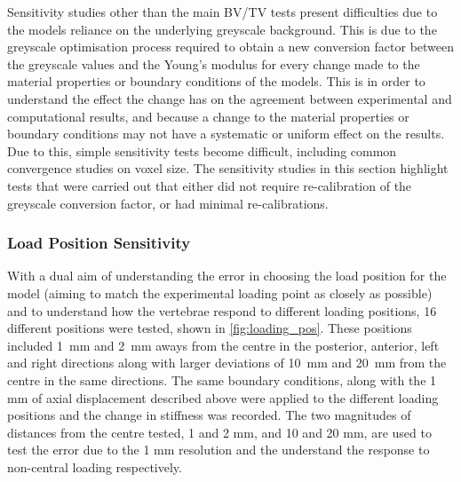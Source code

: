 Sensitivity studies other than the main BV/TV tests present difficulties due to the models reliance on
the underlying greyscale background.  This is due to the greyscale optimisation
process required to obtain a new conversion factor between the greyscale values
and the Young's modulus for every change made to the material properties or
boundary conditions of the models.  This is in order to understand the effect
the change has on the agreement between experimental and computational results,
and because a change to the material properties or boundary conditions may not
have a systematic or uniform effect on the results.  Due to this, simple
sensitivity tests become difficult, including common convergence studies on voxel size. The sensitivity studies in this section highlight tests that were carried out that either did not require re-calibration of the greyscale conversion factor, or had minimal re-calibrations.

\subsubsection{Load Position Sensitivity}

With a dual aim of understanding the error in choosing the load position for the model (aiming to match the experimental loading point as closely as possible) and to  understand how the vertebrae respond to different loading
positions, 16 different positions were tested, shown in
\cref{fig:loading_pos}.
These positions included 1~mm and 2~mm aways from the centre in the posterior,
anterior, left and right directions along with larger deviations of 10~mm and
20~mm from the centre in the same directions.
The same boundary conditions, along with the 1 mm of axial displacement described
above were applied to the different loading positions and the change in
stiffness was recorded. The two magnitudes of distances from the centre tested, 1 and 2 mm, and 10 and 20 mm, are used to test the error due to the 1 mm resolution and the understand the response to non-central loading respectively.

